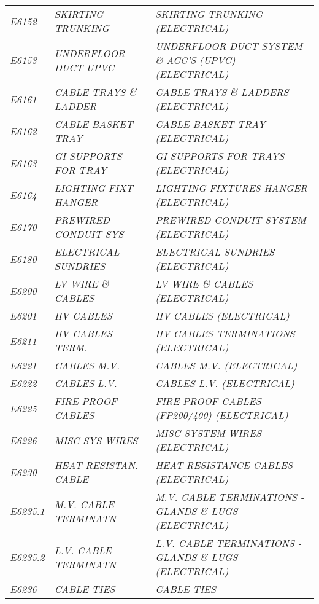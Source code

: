 \begin{landscape}
\begin{longtable}[l]{l%
                  l|%
                  l|}
\itshape E6152       &\itshape SKIRTING TRUNKING   &\itshape SKIRTING TRUNKING (ELECTRICAL)   \\
\itshape E6153       &\itshape UNDERFLOOR DUCT UPVC   &\itshape UNDERFLOOR DUCT SYSTEM \& ACC'S (UPVC) (ELECTRICAL)   \\
\itshape E6161       &\itshape CABLE TRAYS \& LADDER   &\itshape CABLE TRAYS \& LADDERS (ELECTRICAL)   \\
\itshape E6162       &\itshape CABLE BASKET TRAY   &\itshape CABLE BASKET TRAY (ELECTRICAL)   \\
\itshape E6163       &\itshape GI SUPPORTS FOR TRAY   &\itshape GI SUPPORTS FOR TRAYS (ELECTRICAL)   \\
\itshape E6164       &\itshape LIGHTING FIXT HANGER   &\itshape LIGHTING FIXTURES HANGER (ELECTRICAL)   \\
\itshape E6170       &\itshape PREWIRED CONDUIT SYS   &\itshape PREWIRED CONDUIT SYSTEM (ELECTRICAL)   \\
\itshape E6180       &\itshape ELECTRICAL SUNDRIES   &\itshape ELECTRICAL SUNDRIES (ELECTRICAL)   \\
\itshape E6200       &\itshape LV WIRE \& CABLES   &\itshape LV WIRE \& CABLES (ELECTRICAL)   \\
\itshape E6201       &\itshape HV CABLES   &\itshape HV CABLES (ELECTRICAL)   \\
\itshape E6211       &\itshape HV CABLES TERM.   &\itshape HV CABLES TERMINATIONS (ELECTRICAL)   \\
\itshape E6221       &\itshape CABLES M.V.   &\itshape CABLES M.V. (ELECTRICAL)   \\
\itshape E6222       &\itshape CABLES L.V.   &\itshape CABLES L.V. (ELECTRICAL)   \\
\itshape E6225       &\itshape FIRE PROOF CABLES   &\itshape FIRE PROOF CABLES (FP200/400) (ELECTRICAL)   \\
\itshape E6226       &\itshape MISC SYS WIRES   &\itshape MISC SYSTEM WIRES (ELECTRICAL)   \\
\itshape E6230       &\itshape HEAT RESISTAN. CABLE   &\itshape HEAT RESISTANCE CABLES (ELECTRICAL)   \\
\itshape E6235.1     &\itshape M.V. CABLE TERMINATN   &\itshape M.V. CABLE TERMINATIONS - GLANDS \& LUGS (ELECTRICAL)   \\
\itshape E6235.2     &\itshape L.V. CABLE TERMINATN   &\itshape L.V. CABLE TERMINATIONS - GLANDS \& LUGS (ELECTRICAL)   \\
\itshape E6236       &\itshape CABLE TIES   &\itshape CABLE TIES   \\

\end{longtable}
\end{landscape}
